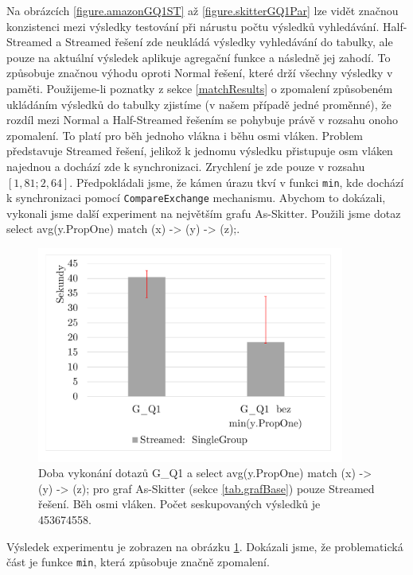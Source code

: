 Na obrázcích \ref{figure.amazonGQ1ST} až \ref{figure.skitterGQ1Par} lze vidět značnou konzistenci mezi výsledky testování při nárustu počtu výsledků vyhledávání.
Half-Streamed a Streamed řešení zde neukládá výsledky vyhledávání do tabulky, ale pouze na aktuální výsledek aplikuje agregační funkce a následně jej zahodí.
To způsobuje značnou výhodu oproti Normal řešení, které drží všechny výsledky v paměti.
Použijeme-li poznatky z sekce \ref{matchResults} o zpomalení způsobeném ukládáním výsledků do tabulky zjistíme (v našem případě jedné proměnné), že rozdíl mezi Normal a Half-Streamed řešením se pohybuje právě v rozsahu onoho zpomalení.
To platí pro běh jednoho vlákna i běhu osmi vláken. 
Problem představuje Streamed řešení, jelikož k jednomu výsledku přistupuje osm vláken najednou a dochází zde k synchronizaci. 
Zrychlení je zde pouze v rozsahu $[1,81; 2,64]$.
Předpokládali jsme, že kámen úrazu tkví v funkci \verb+min+, kde dochází k synchronizaci pomocí \verb+CompareExchange+ mechanismu.
Abychom to dokázali, vykonali jsme další experiment na největším grafu As-Skitter. Použili jsme dotaz select avg(y.PropOne) match (x) -> (y) -> (z);.

\begin{figure}[!htp]
    \centering
    \begin{minipage}{0.45\textwidth}
        \centering
        \includegraphics[width=0.9\textwidth]{../img/skitterGroupByQ1ParNoMin.pdf} %
        \caption{Doba vykonání dotazů G\_Q1 a select avg(y.PropOne) match (x) -> (y) -> (z); pro graf As-Skitter (sekce \ref{tab.grafBase}) pouze Streamed řešení. Běh osmi vláken. Počet seskupovaných výsledků je 453674558.}
        \label{figure.skitterGQ1ParNoMin}
    \end{minipage}\hfill
\end{figure}

Výsledek experimentu je zobrazen na obrázku \ref{figure.skitterGQ1ParNoMin}. 
Dokázali jsme, že problematická část je funkce \verb+min+, která způsobuje značně zpomalení.


